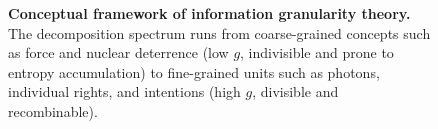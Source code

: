 \documentclass[11pt,a4paper]{article}
\begin{document}
\begin{figure}[p]
\caption{\textbf{Conceptual framework of information granularity theory.} The decomposition spectrum runs from coarse-grained concepts such as force and nuclear deterrence (low $g$, indivisible and prone to entropy accumulation) to fine-grained units such as photons, individual rights, and intentions (high $g$, divisible and recombinable).}
\label{fig:concept}
\end{figure}
\end{document}
